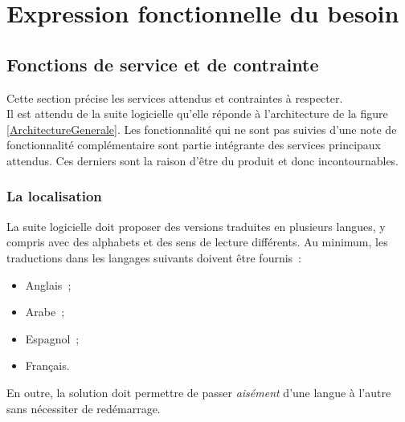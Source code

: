 \chapter{Expression fonctionnelle du besoin}

\section{Fonctions de service et de contrainte}
Cette section précise les services attendus et contraintes à respecter.
\\
Il est attendu de la suite logicielle qu'elle réponde à l'architecture de la figure \ref{ArchitectureGenerale}.
Les fonctionnalité qui ne sont pas suivies d'une note de fonctionnalité complémentaire sont partie intégrante des services principaux attendus.
Ces derniers sont la raison d'être du produit et donc incontournables.

\subsection{La localisation}
La suite logicielle doit proposer des versions traduites en plusieurs langues, y compris avec des alphabets et des sens de lecture différents.
Au minimum, les traductions dans les langages suivants doivent être fournis~:
\begin{itemize}
	\item Anglais~;
	\item Arabe~;
	\item Espagnol~;
	\item Français.
\end{itemize}
En outre, la solution doit permettre de passer \emph{aisément} d'une langue à l'autre sans nécessiter de redémarrage.

